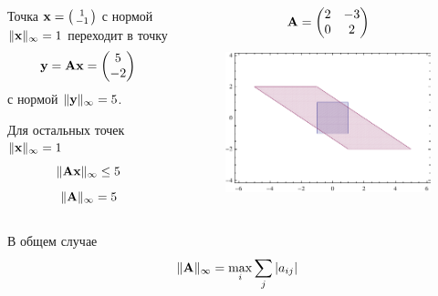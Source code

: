 \documentclass[professionalfonts,compress,unicode]{beamer}
\begin{document}
{
\begin{columns}[T]
\begin{column}{0.6\textwidth}
Точка 
${\bf x} = \left(\begin{smallmatrix}
	1\\-1
\end{smallmatrix}\right)$
 с нормой $\|{\bf x}\|_\infty = 1$ переходит в точку $${\bf y} = {\bf A}{\bf x} = \begin{pmatrix}
	5\\-2
\end{pmatrix}$$
 с нормой $\|{\bf y}\|_\infty = 5$. 

Для остальных точек $\|{\bf x}\|_\infty = 1$ 
$$\|{\bf A}{\bf x}\|_\infty \leq 5$$
$$
\|{\bf A}\|_\infty = 5
$$
\end{column}

\begin{column}{0.4\textwidth}
$$
{\bf A} = \begin{pmatrix}
	2&-3\\
	0&2
\end{pmatrix}
$$
\begin{figure}%
\includegraphics[width=\columnwidth]{infty.pdf}%
\end{figure}
\end{column}
\end{columns}
\begin{block}{В общем случае}
$$
\|{\bf A}\|_\infty = \max_i \sum_j |a_{ij}|
$$
\end{block}
}
\end{document}
